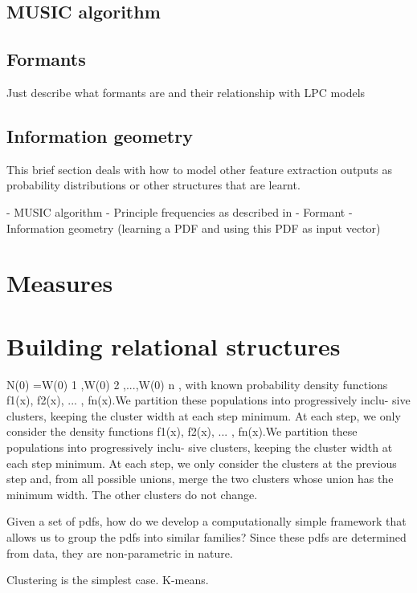 \documentclass[../main.tex]{subfiles}
\begin{document}
\subsection{MUSIC algorithm}

\subsection{Formants}
Just describe what formants are and their relationship with LPC models
\subsection{Information geometry}
This brief section deals with how to model other feature extraction outputs as probability distributions or other structures that are learnt.



- MUSIC algorithm
- Principle frequencies as described in \cite{Chou2008}
- Formant
- Information geometry (learning a PDF and using this PDF as input vector)





\section{Measures}\label{measures_review}
\section{Building relational structures}\label{algorithms_review}

\cite{VoVan2010}
N(0) ={W(0)
1 ,W(0) 2 ,...,W(0) n }, with known probability
density functions {f1(x), f2(x), ... , fn(x)}.We partition these populations into progressively inclu- sive clusters, keeping the cluster width at each step minimum. At each step, we only consider the
density functions {f1(x), f2(x), ... , fn(x)}.We partition these populations into progressively inclu- sive clusters, keeping the cluster width at each step minimum. At each step, we only consider the
clusters at the previous step and, from all possible unions, merge the two clusters whose union
has the minimum width. The other clusters do not change.

\cite{Goh2008}
Given a set of pdfs, how do
we develop a computationally simple framework that allows us to group the pdfs into
similar families? Since these pdfs are determined from data, they are non-parametric in
nature.

\cite{hastie2008}
Clustering is the simplest case. K-means. 
\end{document}
